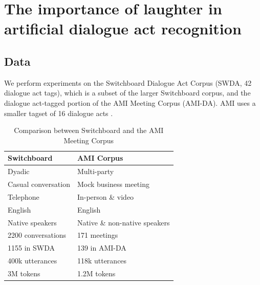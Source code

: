 \documentclass[11pt,a4paper]{article}
\begin{document}

\section{The importance of laughter in artificial dialogue act recognition}
\label{sec:dar}


\subsection{Data}\label{sec:data}
We perform experiments on the Switchboard Dialogue Act Corpus (SWDA,
42 dialogue act tags), which is a subset of the larger Switchboard
corpus, and the dialogue act-tagged portion of the AMI Meeting Corpus
(AMI-DA).  AMI uses a smaller tagset of 16 dialogue acts
\citep{GuidelinesDialogueAct2005}.


\begin{table}[ht]
\small
\centering
\begin{tabular}{@{}ll@{}}
\textbf{Switchboard}       & \textbf{AMI Corpus}                     \\\hline
Dyadic                     & Multi-party                             \\
Casual conversation        & Mock business meeting                   \\
Telephone                  & In-person \& video                      \\
English                    & English                                 \\ 
Native speakers            & Native \& non-native speakers           \\ 
2200 conversations         & 171 meetings                            \\
  \hspace{1em} 1155 in SWDA               & \hspace{1em} 139 in AMI-DA                           \\
400k utterances             & 118k utterances                         \\
  3M tokens                  & 1.2M tokens                             \\
\end{tabular}  
\caption{Comparison between Switchboard and the AMI Meeting Corpus
  \label{table:corpora}}
\end{table}
\end{document}
